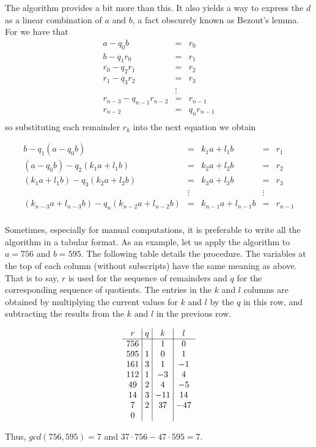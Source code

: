 \documentclass{article}
\theoremstyle{definition}
\theoremstyle{definition}
\theoremstyle{definition}
\begin{document}
The algorithm provides a bit more than this.  It also yields a way to express the $d$ as a linear
combination of $a$ and $b$, a fact obscurely known as Bezout's lemma.  For we have that
\begin{eqnarray*}
  a  -q_0b    &=&  r_0    \\
  b  -q_1r_0  &=&   r_1   \\
  r_0 - q_2r_1 &=& r_2    \\
  r_1 - q_3r_2 &=& r_3    \\
      &\vdots&            \\
  r_{n-3} - q_{n-1}r_{n-2} &=& r_{n-1}  \\
  r_{n-2} &=& q_nr_{n-1} \\
\end{eqnarray*}
so substituting each remainder $r_k$ into the next equation we obtain 
\begin{table}[ht]
\[
\begin{array}{ccccc}
  b                     - q_1(a - q_0b)    &=& k_1a + l_1b &=& r_1 \\
  (a - q_0b)            - q_2(k_1a + l_1b) &=& k_2a + l_2b &=& r_2 \\
  (k_1a + l_1b)         - q_3(k_2a + l_2b) &=& k_3a + l_3b &=& r_3  \\
                                       &\vdots &        &\vdots&   \\
  (k_{n-3}a + l_{n-3}b) - q_n(k_{n-2}a + l_{n-2}b) &=& k_{n-1} a + l_{n-1} b &=& r_{n-1} \\
\end{array}
\]
\end{table}

Sometimes, especially for manual computations, it is preferable to write  all the algorithm in a tabular
format.  As an example, let us apply the algorithm to $a=756$ and $b=595$.  The following table details
the procedure. The variables at the top of each column (without subscripts) have the same meaning as above.
That is to say, $r$ is used for the sequence of remainders and $q$ for the corresponding sequence of 
quotients.  The entries in the $k$ and $l$ columns are obtained by multiplying the current values for $k$
and $l$ by the $q$ in this row, and subtracting the results from the $k$ and $l$ in the previous row.

\begin{table}[h]
\[
\begin{array}{c@{~\vline~}c@{~\vline~}c@{~\vline~}c} 
  r   & q  & k  &  l \\
\hline
 756  &    &    1 &    0   \\
 595  & 1  &    0 &    1   \\
 161  & 3  &    1 &   -1   \\
 112  & 1  &   -3 &    4   \\
  49  & 2  &    4 &   -5   \\
  14  & 3  &  -11 &   14   \\
   7  & 2  &   37 &  -47   \\
   0  &    &      &        \\
\end{array}
\]
\end{table}
Thus, $gcd(756, 595) = 7$ and $37 \cdot 756 - 47 \cdot 595 = 7$.
\end{document}
